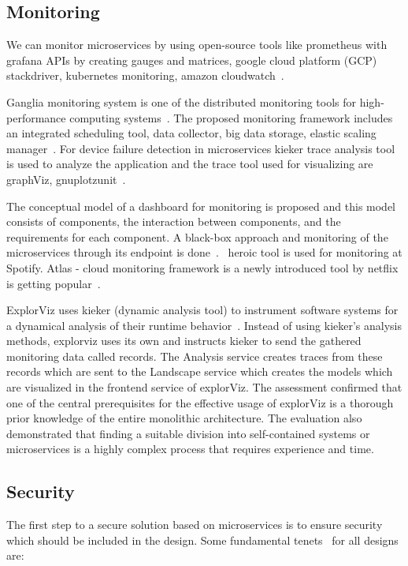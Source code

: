 \subsection{Monitoring}%
We can monitor microservices by using open-source tools like prometheus with grafana APIs by creating gauges and matrices, google cloud platform (GCP) stackdriver, kubernetes monitoring, amazon cloudwatch~\cite{Kalske2017, Zhang2019, Monterio2018, Venugopal2017}.

\par Ganglia monitoring system is one of the distributed monitoring tools for high-performance computing systems~\cite{Kristiani2020}. The proposed monitoring framework includes an integrated scheduling tool, data collector, big data storage, elastic scaling manager~\cite{Zhihui2020}. For device failure detection in microservices kieker trace analysis tool is used to analyze the application and the trace tool used for visualizing are graphViz, gnuplotzunit~\cite{Saman2017}.

\par The conceptual model of a dashboard for monitoring is proposed and this model consists of components, the interaction between components, and the requirements for each component. 
A black-box approach and monitoring of the microservices through its endpoint is done~\cite{Utomo2020}.~\cite{Kevin2015} heroic tool is used for monitoring at Spotify. Atlas - cloud monitoring framework is a newly introduced tool by netflix is getting popular~\cite{Netflix}. 

\par ExplorViz uses kieker (dynamic analysis tool) to instrument software systems for a dynamical analysis of their runtime behavior~\cite{Lenga2019}. Instead of using kieker’s analysis methods, explorviz uses its own and instructs kieker to send the gathered monitoring data called records. The Analysis service creates traces from these records which are sent to the Landscape service which creates the models which are visualized in the frontend service of explorViz. The assessment confirmed that one of the central prerequisites for the effective usage of explorViz is a thorough prior knowledge of the entire monolithic architecture. The evaluation also demonstrated that finding a suitable division into self-contained systems or microservices is a highly complex process that requires experience and time.


\subsection{Security}%
The first step to a secure solution based on microservices is to ensure security which should be included in the design. Some fundamental tenets~\cite{Olaf2016} for all designs are: 


